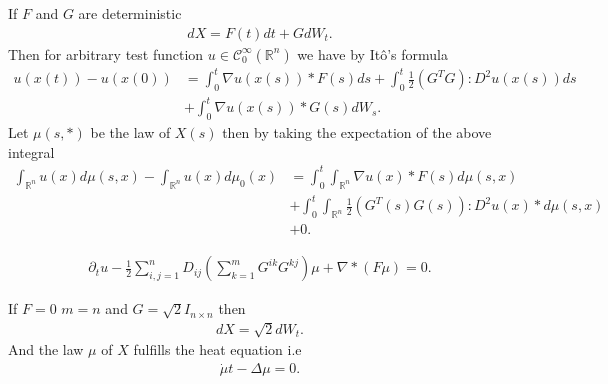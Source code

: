 \begin{remark} 
 If $F$ and $G$ are deterministic 
 \begin{align*}
   dX =  F(t) dt + GdW_t
 .\end{align*}
 Then for arbitrary test function $u \in  \mathcal{C}_0^{\infty}(\mathbb{R}^{n} ) $ we have  by It\^o's formula 
 \begin{align*}
   u(x(t)) - u(x(0)) &= \int_0^{t} \nabla u (x(s)) * F(s) ds + \int_0^{t}  \frac{1}{2}(G^{T}G ) : D^2u(x(s)) ds \\
                     &+ \int_0^{t} \nabla u(x(s)) * G(s) dW_{s} 
 .\end{align*}
 Let $\mu(s,*)$  be the law of $X(s)$ then by taking the expectation of the above integral 
 \begin{align*}
   \int_{\mathbb{R}^{n} } u(x) d\mu(s,x) - \int_{\mathbb{R}^{n} } u(x) d\mu_0(x) &=  \int_{0}^{t} \int_{\mathbb{R}^{n} }  \nabla u(x) * F(s) d\mu(s,x)\\
                                                                                 &+ \int_0^{t} \int_{\mathbb{R}^{n} }  \frac{1}{2}(G^{T}(s)G(s)) : D^2 u(x) * d\mu (s,x) \\
                                                                                 &+ 0
 .\end{align*}
\end{remark}
\newpage
\begin{definition}
 \begin{align*}
   \partial_t u  - \frac{1}{2} \sum_{i,j=1}^{n}  D_{ij} (\sum_{k=1}^{m}  G^{ik}G^{kj}  )\mu  + \nabla * (F \mu )  = 0 
 .\end{align*} 
\end{definition}
\begin{example}
  If $F=0$  $m=n$ and $G=\sqrt{2}I_{n \times  n} $ then 
  \begin{align*}
    dX = \sqrt{2} dW_t 
  .\end{align*}
  And the law $\mu $ of $X$ fulfills the heat equation i.e
  \begin{align*}
    \dot{\mu} t- \Delta \mu  = 0
  .\end{align*}
\end{example}
